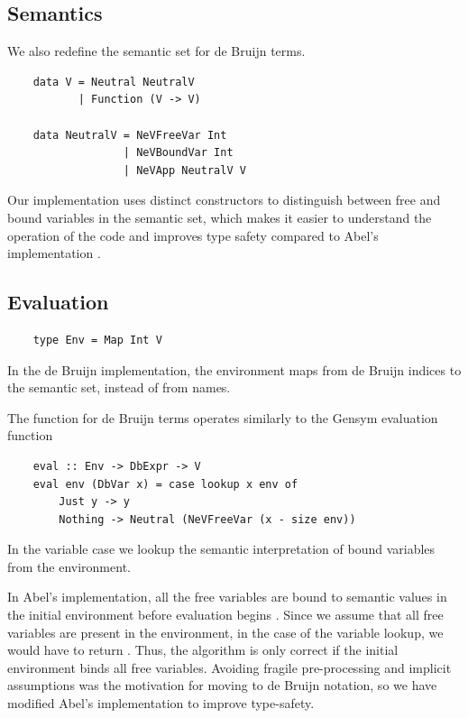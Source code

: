\subsection{Semantics}

We also redefine the semantic set for de Bruijn terms.

\begin{lstlisting}
    data V = Neutral NeutralV
           | Function (V -> V)

    data NeutralV = NeVFreeVar Int
                  | NeVBoundVar Int
                  | NeVApp NeutralV V
\end{lstlisting}

Our implementation uses distinct constructors to distinguish between free and bound variables in the semantic set, which makes it easier to understand the operation of the code and improves type safety compared to Abel's implementation \cite{deBruijn}.


\subsection{Evaluation}

\begin{lstlisting}
    type Env = Map Int V
\end{lstlisting}

In the de Bruijn implementation, the environment maps from de Bruijn indices to the semantic set, instead of from names.

The  function for de Bruijn terms operates similarly to the Gensym evaluation function

\begin{lstlisting}
    eval :: Env -> DbExpr -> V
    eval env (DbVar x) = case lookup x env of
        Just y -> y
        Nothing -> Neutral (NeVFreeVar (x - size env))
\end{lstlisting}

In the variable case we lookup the semantic interpretation of bound variables from the environment. 

In Abel's implementation, all the free variables are bound to semantic values in the initial environment before evaluation begins \cite{deBruijn}. Since we assume that all free variables are present in the environment, in the  case of the variable lookup, we would have to return . Thus, the algorithm is only correct if the initial environment binds all free variables. Avoiding fragile pre-processing and implicit assumptions was the motivation for moving to de Bruijn notation, so we have modified Abel's implementation to improve type-safety.

